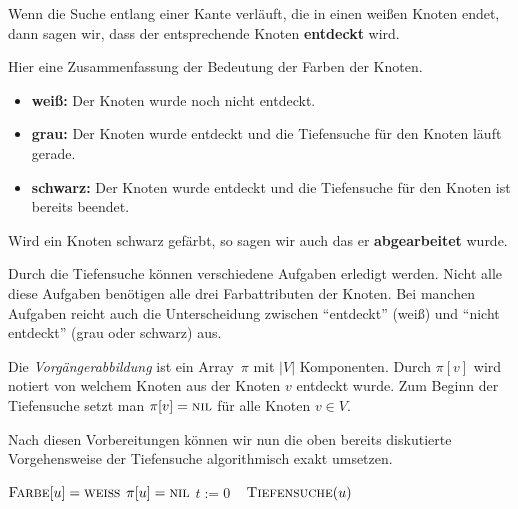 \begin{bem}
	Wenn die Suche entlang einer Kante verläuft, die in einen weißen Knoten endet, dann sagen wir, dass der entsprechende Knoten \textbf{entdeckt} wird.

Hier eine Zusammenfassung der Bedeutung der Farben der Knoten.  
\begin{itemize}
	\item[] {\bfseries weiß:} Der Knoten wurde noch nicht entdeckt. 
	\item[] {\bfseries grau:} Der Knoten wurde entdeckt und die Tiefensuche für den Knoten läuft gerade.
	\item[] {\bfseries schwarz:} Der Knoten wurde entdeckt und die Tiefensuche für den Knoten ist bereits beendet.
\end{itemize}

Wird ein Knoten schwarz gefärbt, so sagen wir auch das er \textbf{abgearbeitet} wurde.

Durch die Tiefensuche können verschiedene Aufgaben erledigt werden. Nicht alle diese Aufgaben benötigen alle drei Farbattributen der Knoten. Bei manchen Aufgaben reicht auch die Unterscheidung zwischen ``entdeckt'' (weiß) und ``nicht entdeckt'' (grau oder schwarz) aus. 
\end{bem} 

\begin{bem}
	Die \emph{Vorgängerabbildung} ist ein Array~$\pi$ mit $|V|$ Komponenten.
	Durch $\pi[v]$ wird notiert von welchem Knoten aus der Knoten $v$ entdeckt wurde.
	Zum Beginn der Tiefensuche setzt man $\pi[v]=\mathop{\text{\textsc{nil}}}$ für alle Knoten $v \in V$.
\end{bem} 

\begin{bem} 
	Nach diesen Vorbereitungen können wir nun die oben bereits diskutierte Vorgehensweise der Tiefensuche algorithmisch exakt umsetzen.	
	\begin{algorithm}[H]
		\caption{$\cc{Vollständige-Tiefensuche}(D)$}
		\begin{algorithmic}[1]
			\STATE $\mathop{\text{\textsc{Farbe}}}[u]=\mathop{\text{\textsc{weiß}}}$
			\STATE $\pi[u]=\mathop{\text{\textsc{nil}}}$
			\ENDFOR
			\STATE $t := 0$ \  
			\label{line:tiefensuche-hauptschleife-start}
			\STATE $\mathop{\text{\textsc{Tiefensuche}}}(u)$
			\ENDIF 
			\ENDFOR\label{line:tiefensuche-hauptschleife-ende}
		\end{algorithmic}
	\end{algorithm}
\end{bem}


